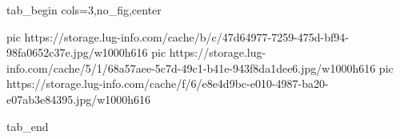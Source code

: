  
 
 
 
 


\ifcmt
  tab_begin cols=3,no_fig,center

     pic https://storage.lug-info.com/cache/b/c/47d64977-7259-475d-bf94-98fa0652c37e.jpg/w1000h616%
     pic https://storage.lug-info.com/cache/5/1/68a57aee-5c7d-49c1-b41e-943f8da1dee6.jpg/w1000h616%
     pic https://storage.lug-info.com/cache/f/6/e8e4d9bc-e010-4987-ba20-e07ab3e84395.jpg/w1000h616%

  tab_end
\fi
